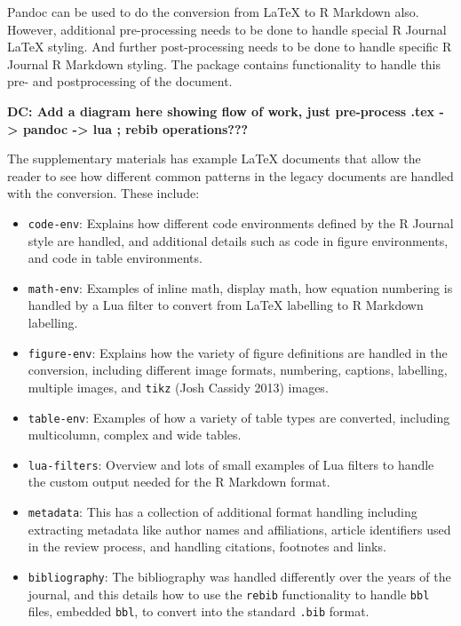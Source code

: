 Pandoc can be used to do the conversion from LaTeX to R Markdown also. However, additional pre-processing needs to be done to handle special R Journal LaTeX styling. And further post-processing needs to be done to handle specific R Journal R Markdown styling. The  package contains functionality to handle this pre- and postprocessing of the document.

\textbf{DC: Add a diagram here showing flow of work, just pre-process .tex -\textgreater{} pandoc -\textgreater{} lua ; rebib operations???}

The supplementary materials has example LaTeX documents that allow the reader to see how different common patterns in the legacy documents are handled with the conversion. These include:

\begin{itemize}
\tightlist
\item
  \texttt{code-env}: Explains how different code environments defined by the R Journal style are handled, and additional details such as code in figure environments, and code in table environments.
\item
  \texttt{math-env}: Examples of inline math, display math, how equation numbering is handled by a Lua filter to convert from LaTeX labelling to R Markdown labelling.
\item
  \texttt{figure-env}: Explains how the variety of figure definitions are handled in the conversion, including different image formats, numbering, captions, labelling, multiple images, and \texttt{tikz} (Josh Cassidy 2013) images.
\item
  \texttt{table-env}: Examples of how a variety of table types are converted, including multicolumn, complex and wide tables.
\item
  \texttt{lua-filters}: Overview and lots of small examples of Lua filters to handle the custom output needed for the R Markdown format.
\item
  \texttt{metadata}: This has a collection of additional format handling including extracting metadata like author names and affiliations, article identifiers used in the review process, and handling citations, footnotes and links.
\item
  \texttt{bibliography}: The bibliography was handled differently over the years of the journal, and this details how to use the \texttt{rebib} functionality to handle \texttt{bbl} files, embedded \texttt{bbl}, to convert into the standard \texttt{.bib} format.
\end{itemize}

